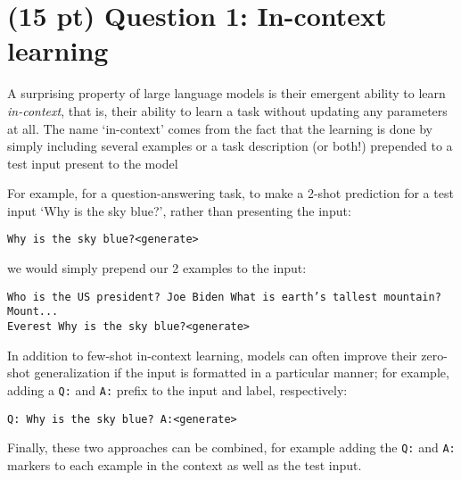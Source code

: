 \documentclass[12pt]{article}
\begin{document}
\section*{(15 pt) Question 1: In-context learning}
A surprising property of large language models is their emergent ability to learn \textit{in-context}, that is, their ability to learn a task without updating any parameters at all. The name `in-context' comes from the fact that the learning is done by simply including several examples or a task description (or both!) prepended to a test input present to the model

For example, for a question-answering task, to make a 2-shot prediction for a test input `Why is the sky blue?', rather than presenting the input:

\texttt{Why is the sky blue?\textless generate\textgreater}

we would simply prepend our 2 examples to the input:

\texttt{Who is the US president? Joe Biden What is earth's tallest mountain? Mount... \\
Everest Why is the sky blue?\textless generate\textgreater}

In addition to few-shot in-context learning, models can often improve their zero-shot generalization if the input is formatted in a particular manner; for example, adding a \texttt{Q:} and \texttt{A:} prefix to the input and label, respectively:

\texttt{Q: Why is the sky blue? A:\textless generate\textgreater}

Finally, these two approaches can be combined, for example adding the \texttt{Q:} and \texttt{A:} markers to each example in the context as well as the test input.
\end{document}
